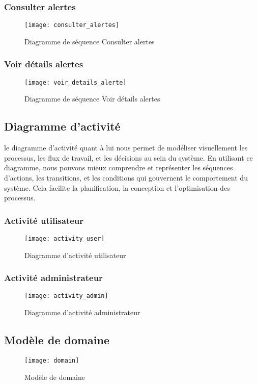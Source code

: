 \subsubsection{Consulter alertes}
\begin{figure}[H]
	\texttt{[image: consulter\_alertes]}
	\caption{Diagramme de séquence Consulter alertes}
\end{figure}

\subsubsection{Voir détails alertes}
\begin{figure}[H]
	\texttt{[image: voir\_details\_alerte]}
	\caption{Diagramme de séquence Voir détails alertes}
\end{figure}

\subsection{Diagramme d’activité}
le diagramme d'activité quant à lui nous permet de modéliser visuellement les processus, les flux de travail, et les décisions au sein du système. En utilisant ce diagramme, nous pouvons mieux comprendre et représenter les séquences d'actions, les transitions, et les conditions qui gouvernent le comportement du système. Cela facilite la planification, la conception et l'optimisation des processus.

\subsubsection{Activité utilisateur}
\begin{figure}[H]
	\texttt{[image: activity\_user]}
	\caption{Diagramme d’activité utilisateur}
\end{figure}

\subsubsection{Activité administrateur}
\begin{figure}[H]
	\texttt{[image: activity\_admin]}
	\caption{Diagramme d’activité administrateur}
\end{figure}

\subsection{Modèle de domaine}
\begin{figure}[H]
	\texttt{[image: domain]}
	\caption{Modèle de domaine}
\end{figure}

